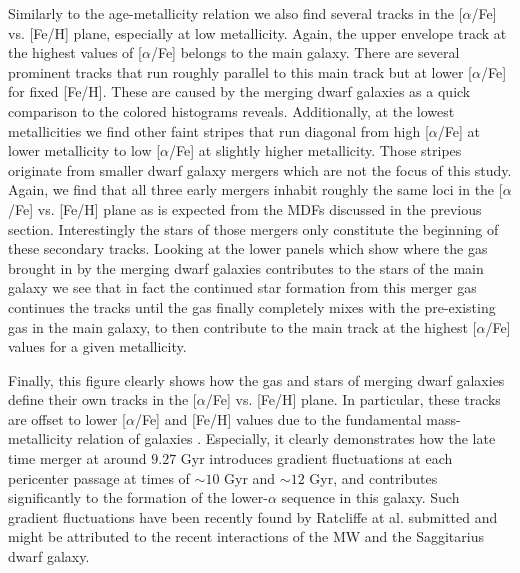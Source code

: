 \documentclass[useAMS,usenatbib]{mnras}
\begin{document}
Similarly to the age-metallicity relation we also find several tracks in the [$\alpha$/Fe] vs. [Fe/H] plane, especially at low metallicity. Again, the upper envelope track at the highest values of [$\alpha$/Fe] belongs to the main galaxy. There are several prominent tracks that run roughly parallel to this main track but at lower [$\alpha$/Fe] for fixed [Fe/H]. These are caused by the merging dwarf galaxies as a quick comparison to the colored histograms reveals. Additionally, at the lowest metallicities we find other faint stripes that run diagonal from high [$\alpha$/Fe] at lower metallicity to low [$\alpha$/Fe] at slightly higher metallicity. Those stripes originate from smaller dwarf galaxy mergers which are not the focus of this study. Again, we find that all three early mergers inhabit roughly the same loci in the [$\alpha$/Fe] vs. [Fe/H] plane as is expected from the MDFs discussed in the previous section. Interestingly the stars of those mergers only constitute the beginning of these secondary tracks.
Looking at the lower panels which show where the gas brought in by the merging dwarf galaxies contributes to the stars of the main galaxy we see that in fact the continued star formation from this merger gas continues the tracks until the gas finally completely mixes with the pre-existing gas in the main galaxy, to then contribute to the main track at the highest [$\alpha$/Fe] values for a given metallicity.

Finally, this figure clearly shows how the gas and stars of merging dwarf galaxies define their own tracks in the [$\alpha$/Fe] vs. [Fe/H] plane. In particular, these tracks are offset to lower [$\alpha$/Fe] and [Fe/H] values due to the fundamental mass-metallicity relation of galaxies \citep[e.g.][]{Kirby2013}. Especially, it clearly demonstrates how the late time merger at around $9.27$ Gyr introduces gradient fluctuations at each pericenter passage at times of $\sim10$ Gyr and $\sim12$ Gyr, and contributes significantly to the formation of the lower-$\alpha$ sequence in this galaxy. Such gradient fluctuations have been recently found by Ratcliffe at al. submitted and might be attributed to the recent interactions of the MW and the Saggitarius dwarf galaxy.
\end{document}
